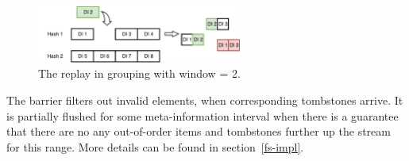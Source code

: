 \begin{figure}[ht]
  \centering
  \includegraphics[width=0.6\textwidth]{pics/grouping-replaying}
  \caption{The replay in grouping with window = 2. %
  }
  \label {grouping-replaying}
\end{figure}


The barrier filters out invalid elements, when corresponding tombstones arrive. 
It is partially flushed for some meta-information interval when there is a guarantee that there are no any out-of-order items and tombstones further up the stream for this range.
More details can be found  in section~\ref{fs-impl}.



